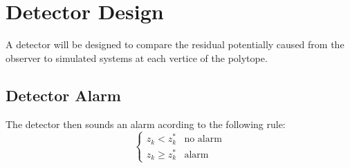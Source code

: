 \documentclass[]{article}
\begin{document}
\section{Detector Design}
A detector will be designed to compare the residual potentially caused from the observer 
to simulated systems at each vertice of the polytope.

\subsection{Detector Alarm}
The detector then sounds an alarm acording to the following rule:
\begin{equation}\label{eq:detector_alarm_rule}
    \begin{cases}
        z_k < z_k^*     &\text{no alarm}\\
        z_k \geq z_k^*  &\text{alarm}
    \end{cases}
\end{equation}



%

%





\end{document}
